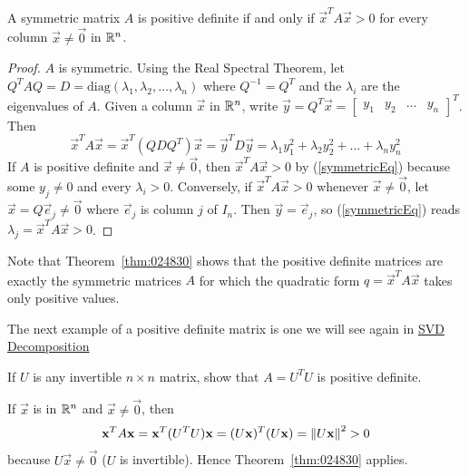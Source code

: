 \documentclass{ximera}
\begin{document}
\begin{theorem}\label{thm:024830}
A symmetric matrix $A$ is positive definite if and only if $\vec{x}^{T} A \vec{x} > 0$ for every column $\vec{x} \neq \vec{0}$ in $\mathbb{R}^n$.
\end{theorem}

\begin{proof}
$A$ is symmetric.  Using  the Real Spectral Theorem, let $Q^{T}AQ = D = \mbox{diag}(\lambda_{1}, \lambda_{2}, \dots, \lambda_{n})$ where $Q^{-1} = Q^{T}$ and the $\lambda_{i}$ are the eigenvalues of $A$. Given a column $\vec{x}$ in $\mathbb{R}^n$, write $\vec{y} = Q^{T}\vec{x} = \left[ \begin{array}{cccc}
y_{1} & y_{2} & \dots & y_{n}
\end{array}\right]^T$. Then
\begin{equation} \label{symmetricEq}
\vec{x}^TA\vec{x} = \vec{x}^T(QDQ^T)\vec{x} = \vec{y}^TD\vec{y} = \lambda_{1}y_{1}^2 + \lambda_{2}y_{2}^2 + \dots + \lambda_{n}y_{n}^2
\end{equation}
If $A$ is positive definite and $\vec{x} \neq \vec{0}$, then $\vec{x}^{T}A\vec{x} > 0$ by (\ref{symmetricEq}) because some $y_{j} \neq 0$ and every $\lambda_{i} > 0$. Conversely, if $\vec{x}^{T}A\vec{x} > 0$ whenever $\vec{x} \neq \vec{0}$, let $\vec{x} = Q\vec{e}_{j} \neq \vec{0}$ where $\vec{e}_{j}$ is column $j$ of $I_{n}$. Then $\vec{y} = \vec{e}_{j}$, so (\ref{symmetricEq}) reads $\lambda_{j} = \vec{x}^{T}A\vec{x} > 0$.
\end{proof}

Note that Theorem~\ref{thm:024830} shows that the positive definite matrices are exactly the symmetric matrices $A$ for which the quadratic form $q = \vec{x}^{T}A\vec{x}$ takes only positive values.  

The next example of a positive definite matrix is one we will see again in \href{https://ximera.osu.edu/oerlinalg/LinearAlgebra/RTH-0060/main}{SVD Decomposition}

\begin{example}\label{exa:024865}
If $U$ is any invertible $n \times n$ matrix, show that $A = U^{T}U$ is positive definite.


\begin{explanation}
  If $\vec{x}$ is in $\mathbb{R}^n$ and $\vec{x} \neq \vec{0}$, then
\begin{equation*}
\mathbf{x}^TA\mathbf{x} =  \mathbf{x}^T(U^TU)\mathbf{x} = (U\mathbf{x})^T(U\mathbf{x})= \left\lVert U\mathbf{x} \right\rVert^2 > 0
\end{equation*}
because $U\vec{x} \neq \vec{0}$ ($U$ is invertible). Hence Theorem~\ref{thm:024830} applies.
\end{explanation}
\end{example}
\end{document}
